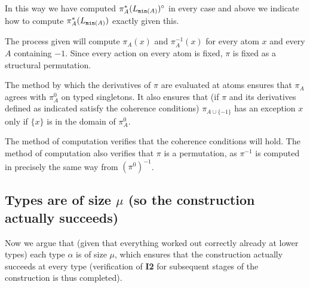 \documentclass[112pt]{article}
\begin{document}
\begin{description}
In this way we have computed $\pi^*_A(L_{{\tt min}(A)})^\circ$ in every case and above we indicate how to compute $\pi^*_A(L_{{\tt min}(A)})$ exactly given this.

 The process given will compute $\pi_A(x)$ and $\pi_A^{-1}(x)$ for every atom $x$ and every $A$ containing $-1$.  Since every action on every atom is fixed, $\pi$ is fixed as a structural permutation.

The method by which the derivatives of $\pi$ are evaluated at atoms ensures that $\pi_A$ agrees with $\pi^0_A$ on typed singletons.  It also ensures that (if $\pi$ and its derivatives defined as indicated satisfy
the coherence conditions) $\pi_{A \cup \{-1\}}$ has an exception $x$ only if $\{x\}$ is in the domain of $\pi^0_A$.

The method of computation verifies that the coherence conditions will hold.  The method of computation also verifies that $\pi$ is a permutation, as $\pi^{-1}$ is computed in precisely the same way from $(\pi^0)^{-1}$.

\end{description}

\newpage
\subsection{Types are of size $\mu$ (so the construction actually succeeds)}

Now we argue that (given that everything worked out correctly already at lower types) each type $\alpha$ is of size $\mu$, which ensures
that the construction actually succeeds at every type (verification of {\bf I2} for subsequent stages of the construction is thus completed).
\end{document}
